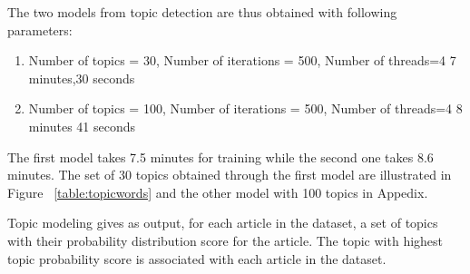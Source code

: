 The two models from topic detection are thus obtained with following parameters:
\begin{enumerate}
 \item Number of topics = 30, Number of iterations = 500, Number of threads=4 7 minutes,30 seconds
 \item Number of topics = 100, Number of iterations = 500, Number of threads=4 8 minutes 41 seconds
\end{enumerate}
The first model takes 7.5 minutes for training while the second one takes 8.6 minutes.
The set of 30 topics obtained through the first model are illustrated in Figure ~\ref{table:topicwords} and the other model with 100 topics in Appedix. 

Topic modeling gives as output, for each article in the dataset, a set of topics with their probability distribution score for the article. The topic with highest topic probability score is associated with each article in the dataset. 


